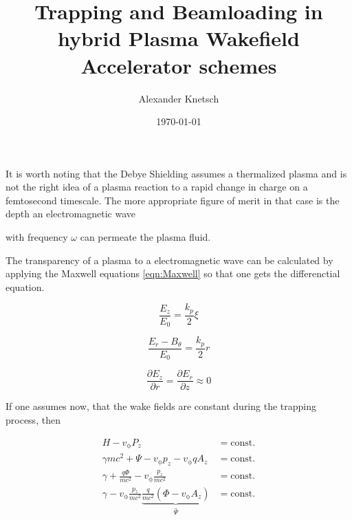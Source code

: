 \documentclass{thesis}
\title{Trapping and Beamloading in hybrid Plasma Wakefield Accelerator schemes}
\author{Alexander Knetsch}
\date{\today}
\begin{document}
\maketitle
\tableofcontents

\cite{mulser2010Book}
It is worth noting that the Debye Shielding assumes a thermalized plasma and is not the right idea of a plasma reaction to a rapid change in charge on a femtosecond timescale. 
The more appropriate figure of merit in that case is the depth an electromagnetic wave 

with frequency $\omega$ can permeate the plasma fluid.

The transparency of a plasma to a electromagnetic wave can be calculated by applying the Maxwell equations \ref{eqn:Maxwell} so that one gets the differenctial equation.



\begin{equation}
\frac{E_z}{E_0}=\frac{k_p}{2}\xi
\end{equation}

\begin{equation}
\frac{E_r-B_\theta}{E_0}=\frac{k_p}{2}r
\end{equation}

\begin{equation}
\frac{\partial E_z}{\partial r}=\frac{\partial E_r}{\partial z} \approx 0
\end{equation}









If one assumes now, that the wake fields are constant during the trapping process, then 

\begin{align}
H-v_\mathrm{\phi}P_z &= \mathrm{const.}\\
\gamma m c^2+\Psi-v_\mathrm{\phi}p_z-v_\mathrm{\phi}qA_z &= \mathrm{const.}\\
\gamma+\frac{q \Phi}{m c^2}-v_\mathrm{\phi} \frac{p_z}{mc^2} &= \mathrm{const.}\\
\gamma - v_\mathrm{\phi} \frac{p_z}{mc^2} \underbrace{\frac{q}{mc^2}(\Phi-v_\mathrm{\phi}A_z)}_{\hat{\Psi}}  &= \mathrm{const.} 
\end{align}
\end{document}
